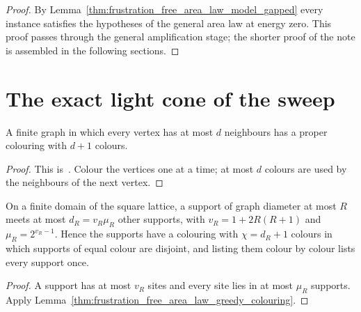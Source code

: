 \begin{proof}\leanok
    By Lemma~\ref{thm:frustration_free_area_law_model_gapped} every instance satisfies the
    hypotheses of the general area law \cite[Theorem~1.1]{OpenAI2026AreaLaw}
    at energy zero. This proof passes through the general amplification stage;
    the shorter proof of the note is assembled in the following sections.
\end{proof}

\section{The exact light cone of the sweep}
\label{sec:frustration_free_area_law_light_cone}

\begin{lemma}
    \label{thm:frustration_free_area_law_greedy_colouring}
    \leanok
    A finite graph in which every vertex has at most $d$ neighbours has a
    proper colouring with $d+1$ colours.
\end{lemma}

\begin{proof}\leanok
    This is~\cite[``Greedy colouring'']{QICLean2026Blueprint}.
    Colour the vertices one at a time; at most $d$ colours are used by the
    neighbours of the next vertex.
\end{proof}

\begin{lemma}
    \label{thm:frustration_free_area_law_colour_layers}
    \leanok
    On a finite domain of the square lattice, a support of graph diameter at
    most $R$ meets at most $d_R=v_R\mu_R$ other supports, with
    $v_R=1+2R(R+1)$ and $\mu_R=2^{v_R-1}$. Hence the supports have a colouring
    with $\chi=d_R+1$ colours in which supports of equal colour are disjoint,
    and listing them colour by colour lists every support once.
\end{lemma}

\begin{proof}\leanok
    A support has at most $v_R$ sites and every site lies in at most $\mu_R$
    supports. Apply Lemma~\ref{thm:frustration_free_area_law_greedy_colouring}.
\end{proof}

